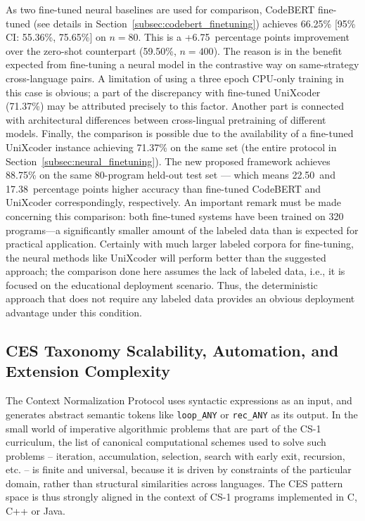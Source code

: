 As two fine-tuned neural baselines are used for comparison, CodeBERT fine-tuned (see details in Section~\ref{subsec:codebert_finetuning}) achieves 66.25\% [95\% CI: 55.36\%, 75.65\%] on $n = 80$. This is a +6.75~percentage points improvement over the zero-shot counterpart (59.50\%, $n = 400$). The reason is in the benefit expected from fine-tuning a neural model in the contrastive way on same-strategy cross-language pairs. A limitation of using a three epoch CPU-only training in this case is obvious; a part of the discrepancy with fine-tuned UniXcoder (71.37\%) may be attributed precisely to this factor. Another part is connected with architectural differences between cross-lingual pretraining of different models. Finally, the comparison is possible due to the availability of a fine-tuned UniXcoder instance achieving 71.37\% on the same set (the entire protocol in Section~\ref{subsec:neural_finetuning}). The new proposed framework achieves 88.75\% on the same 80-program held-out test set --- which means 22.50~and 17.38~percentage points higher accuracy than fine-tuned CodeBERT and UniXcoder correspondingly, respectively. An important remark must be made concerning this comparison: both fine-tuned systems have been trained on 320 programs---a significantly smaller amount of the labeled data than is expected for practical application. Certainly with much larger labeled corpora for fine-tuning, the neural methods like UniXcoder will perform better than the suggested approach; the comparison done here assumes the lack of labeled data, i.e., it is focused on the educational deployment scenario. Thus, the deterministic approach that does not require any labeled data provides an obvious deployment advantage under this condition.

\subsection{CES Taxonomy Scalability, Automation, and Extension Complexity}
\label{subsec:ces_stability}

The Context Normalization Protocol uses syntactic expressions as an input, and generates abstract semantic tokens like \texttt{loop\_ANY} or \texttt{rec\_ANY} as its output. In the small world of imperative algorithmic problems that are part of the CS-1 curriculum, the list of canonical computational schemes used to solve such problems – iteration, accumulation, selection, search with early exit, recursion, etc. – is finite and universal, because it is driven by constraints of the particular domain, rather than structural similarities across languages. The CES pattern space is thus strongly aligned in the context of CS-1 programs implemented in C, C++ or Java.

